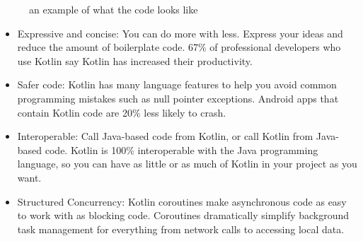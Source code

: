 \documentclass[12pt,oneside]{book}
\begin{document}
\begin{figure}
    \centering
    \caption{an example of what the code looks like}
\end{figure}

\begin{itemize}
    \item Expressive and concise: You can do more with less. Express your ideas and reduce the amount of boilerplate code. 67\% of professional developers who use Kotlin say Kotlin has increased their productivity.
    \item Safer code: Kotlin has many language features to help you avoid common programming mistakes such as null pointer exceptions. Android apps that contain Kotlin code are 20\% less likely to crash.
    \newpage
    \item Interoperable: Call Java-based code from Kotlin, or call Kotlin from Java-based code. Kotlin is 100\% interoperable with the Java programming language, so you can have as little or as much of Kotlin in your project as you want.
    \item Structured Concurrency: Kotlin coroutines make asynchronous code as easy to work with as blocking code. Coroutines dramatically simplify background task management for everything from network calls to accessing local data.


\end{itemize}
\end{document}
